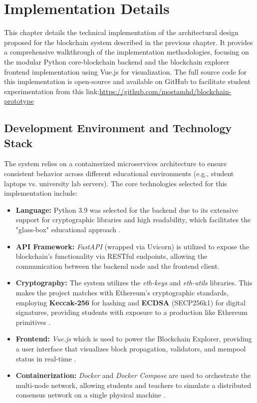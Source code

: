 \chapter{Implementation Details} \label{ch4_implementation}

This chapter details the technical implementation of the architectural design proposed for the blockchain system described in the previous chapter. It provides a comprehensive walkthrough of the implementation methodologies, focusing on the modular Python core-blockchain backend and the blockchain explorer frontend implementation using Vue.js for visualization.
The full source code for this implementation is open-source and available on GitHub to facilitate student experimentation from this link:\url{https://github.com/mostamhd/blockchain-prototype}

\section{Development Environment and Technology Stack} \label{ch4_tech_stack}

The system relies on a containerized microservices architecture to ensure consistent behavior across different educational environments (e.g., student laptops vs. university lab servers). The core technologies selected for this implementation include:

\begin{itemize}
    \item \textbf{Language:} Python 3.9 was selected for the backend due to its extensive support for cryptographic libraries and high readability, which facilitates the "glass-box" educational approach \cite{python_lang}.
    \item \textbf{API Framework:} \textit{FastAPI} (wrapped via Uvicorn) is utilized to expose the blockchain's functionality via RESTful endpoints, allowing the communication between the backend node and the frontend client.
    \item \textbf{Cryptography:} The system utilizes the \textit{eth-keys} and \textit{eth-utils} libraries. This makes the project matches with Ethereum's cryptographic standards, employing \textbf{Keccak-256} for hashing and \textbf{ECDSA} (SECP256k1) for digital signatures, providing students with exposure to a production like Ethereum primitives \cite{wood2014ethereum}.
    \item \textbf{Frontend:} \textit{Vue.js} which is used to power the Blockchain Explorer, providing a user interface that visualizes block propagation, validators, and mempool status in real-time \cite{vuejs}.
    \item \textbf{Containerization:} \textit{Docker} and \textit{Docker Compose} are used to orchestrate the multi-node network, allowing students and teachers to simulate a distributed consensus network on a single physical machine \cite{docker}.
\end{itemize}


